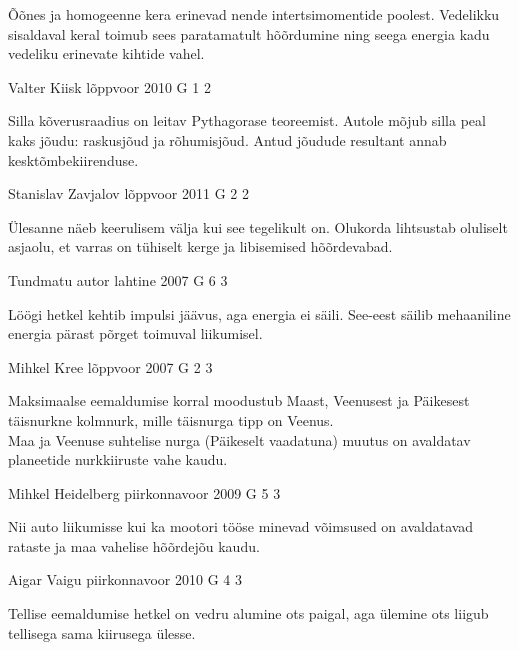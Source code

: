 \documentclass[11pt]{article}
\begin{document}
{{\ifHint
Õõnes ja homogeenne kera erinevad nende intertsimomentide poolest. Vedelikku sisaldaval keral toimub sees paratamatult hõõrdumine ning seega energia kadu vedeliku erinevate kihtide vahel.
\fi
}

{Valter Kiisk} %
{lõppvoor} %
{2010} %
{G 1} %
{2} %
{

\ifHint
Silla kõverusraadius on leitav Pythagorase teoreemist. Autole mõjub silla peal kaks jõudu: raskusjõud ja rõhumisjõud. Antud jõudude resultant annab kesktõmbekiirenduse.
\fi
}

{Stanislav Zavjalov} %
{lõppvoor} %
{2011} %
{G 2} %
{2} %
{

\ifHint
Ülesanne näeb keerulisem välja kui see tegelikult on. Olukorda lihtsustab oluliselt asjaolu, et varras on tühiselt kerge ja libisemised hõõrdevabad.
\fi
}

{Tundmatu autor} %
{lahtine} %
{2007} %
{G 6} %
{3} %
{

\ifHint
Löögi hetkel kehtib impulsi jäävus, aga energia ei säili. See-eest säilib mehaaniline energia pärast põrget toimuval liikumisel.
\fi
}

{Mihkel Kree} %
{lõppvoor} %
{2007} %
{G 2} %
{3} %
{

\ifHint
\osa Maksimaalse eemaldumise korral moodustub Maast, Veenusest ja Päikesest täisnurkne kolmnurk, mille täisnurga tipp on Veenus.\\
\osa Maa ja Veenuse suhtelise nurga (Päikeselt vaadatuna) muutus on avaldatav planeetide nurkkiiruste vahe kaudu.
\fi
}

{Mihkel Heidelberg} %
{piirkonnavoor} %
{2009} %
{G 5} %
{3} %
{

\ifHint
Nii auto liikumisse kui ka mootori tööse minevad võimsused on avaldatavad rataste ja maa vahelise hõõrdejõu kaudu.
\fi
}

{Aigar Vaigu} %
{piirkonnavoor} %
{2010} %
{G 4} %
{3} %
{

\ifHint
Tellise eemaldumise hetkel on vedru alumine ots paigal, aga ülemine ots liigub tellisega sama kiirusega ülesse.
\fi
}

}
\end{document}
